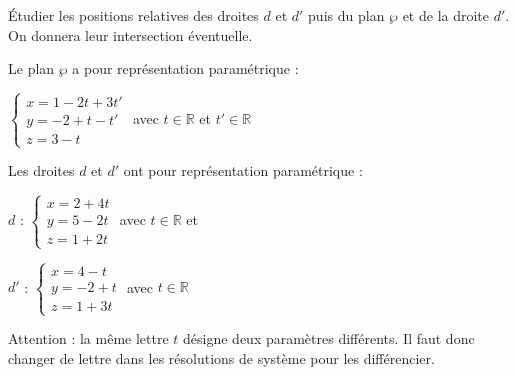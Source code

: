 \documentclass{cornouaille}
\begin{document}
\begin{methode*1}

  \exercice

  \vspace{-\baselineskip}

  \bgroup
  \def\columnseprule{.5pt}
  \begin{multicols}{2}
    Étudier  les positions relatives des
    droites $d$ et  $d'$ puis du plan $\wp$ et de la droite $d'$. On
    donnera leur intersection éventuelle.

    Le plan $\wp$ a pour représentation paramétrique :

    $\begin{cases} x=1-2t+3t'\\y=-2+t-t'\\z=3-t \end{cases}$ avec
    $t\in\mathbb{R}$ et $t'\in\mathbb{R}$

    \columnbreak

    Les droites $d$ et $d'$ ont pour représentation \mbox{paramétrique} :

    $d$ : $\begin{cases} x=2+4t\\y=5-2t\\z=1+2t \end{cases}$ avec
    $t\in\mathbb{R}$ et 

    $d'$ : $\begin{cases} x=4-t\\y=-2+t\\z=1+3t \end{cases}$ avec
    $t\in\mathbb{R}$
  \end{multicols}
  \egroup

  \correction

Attention : la même lettre $t$ désigne deux paramètres différents. Il faut donc changer de lettre dans les résolutions de système pour les différencier.\\


\end{methode*1}
\end{document}
